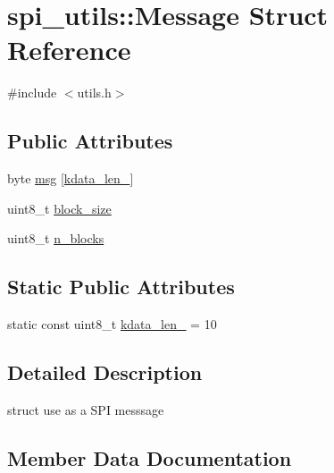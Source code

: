 \hypertarget{structspi__utils_1_1Message}{}\section{spi\+\_\+utils\+:\+:Message Struct Reference}
\label{structspi__utils_1_1Message}


{\ttfamily \#include $<$utils.\+h$>$}

\subsection*{Public Attributes}
\begin{DoxyCompactItemize}
\item 
byte \mbox{\hyperlink{structspi__utils_1_1Message_aef999e9fd6fe0d4ab21aa2a6bf740f55}{msg}} \mbox{[}\mbox{\hyperlink{structspi__utils_1_1Message_a47848d542d0954679bad7a40dc5b0064}{kdata\+\_\+len\+\_\+}}\mbox{]}
\item 
uint8\+\_\+t \mbox{\hyperlink{structspi__utils_1_1Message_a778bc7823110409e3009c773816521be}{block\+\_\+size}}
\item 
uint8\+\_\+t \mbox{\hyperlink{structspi__utils_1_1Message_a00d125aa721450f39c7ae0310090af65}{n\+\_\+blocks}}
\end{DoxyCompactItemize}
\subsection*{Static Public Attributes}
\begin{DoxyCompactItemize}
\item 
static const uint8\+\_\+t \mbox{\hyperlink{structspi__utils_1_1Message_a47848d542d0954679bad7a40dc5b0064}{kdata\+\_\+len\+\_\+}} = 10
\end{DoxyCompactItemize}


\subsection{Detailed Description}
struct use as a S\+PI messsage 

\subsection{Member Data Documentation}
\mbox{\label{structspi__utils_1_1Message_a778bc7823110409e3009c773816521be}} 
